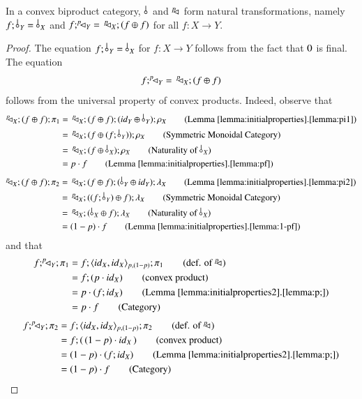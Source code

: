 \begin{lemma}\label{lemma:naturality}
In a convex biproduct category, $\bang{}$ and $^p\!\! \lhd_{}$ form natural transformations, namely 
$f;\bang{Y}=\bang{X}$  and $f;^p\!\! \lhd_{Y} =\, ^p\!\! \lhd_{X};(f\oplus f)$ for all $f\colon X\to Y$.
\end{lemma}
\begin{proof}
The equation $f;\bang{Y}=\bang{X}$ for $f\colon X \to Y$ follows from the fact that $0$ is final. The equation
\[f;^p\!\! \lhd_{Y} =\, ^p\!\! \lhd_{X};(f\oplus f)\]
follows from the universal property of convex products. Indeed, observe that
\begin{align*}
    \diagp{X};(f\oplus f);\pi_1 &=\, \diagp{X};(f\oplus f);(\id{Y}\piu \bang{Y});\runit{X} \tag{Lemma \ref{lemma:initialproperties}.\ref{lemma:pi1}}\\
    &=\, \diagp{X};(f\oplus (f;\bang{Y}));\runit{X}  \tag{Symmetric Monoidal Category}\\
    &=\, \diagp{X};(f\oplus \bang{X});\runit{X} \tag{Naturality of $\bang{X}$}\\
    &= p\cdot f \tag{Lemma \ref{lemma:initialproperties}.\ref{lemma:pf}}
\end{align*}
\begin{align*}
    \diagp{X};(f\oplus f);\pi_2 &=\, \diagp{X};(f\oplus f);(\bang{Y} \piu \id{Y} );\lunit{X} \tag{Lemma \ref{lemma:initialproperties}.\ref{lemma:pi2}}\\
    &=\, \diagp{X};( (f;\bang{Y})\oplus f);\lunit{X}  \tag{Symmetric Monoidal Category}\\
    &=\, \diagp{X};( \bang{X} \oplus f);\lunit{X} \tag{Naturality of $\bang{X}$}\\
    &= (1-p)\cdot f \tag{Lemma \ref{lemma:initialproperties}.\ref{lemma:1-pf}}
\end{align*}
and that
\begin{align*}
f;\diagp{Y};\pi_1 &= f ; \langle \id{X}, \id{X} \rangle_{p,(1-p)};\pi_1 \tag{def. of $\diagp{}$}\\
&= f; (p\cdot \id{X}) \tag{convex product} \\
&= p\cdot(f;\id{X}) \tag{Lemma \ref{lemma:initialproperties2}.\ref{lemma:p;}}\\
&=p\cdot f \tag{Category}
\end{align*}
\begin{align*}
f;\diagp{Y};\pi_2 &= f ; \langle \id{X}, \id{X} \rangle_{p,(1-p)};\pi_2 \tag{def. of $\diagp{}$}\\
&= f; (\,(1-p)\cdot \id{X}\,) \tag{convex product} \\
&= (1-p)\cdot(f;\id{X}) \tag{Lemma \ref{lemma:initialproperties2}.\ref{lemma:p;}}\\
&=(1-p)\cdot f \tag{Category}
\end{align*}
\end{proof}

